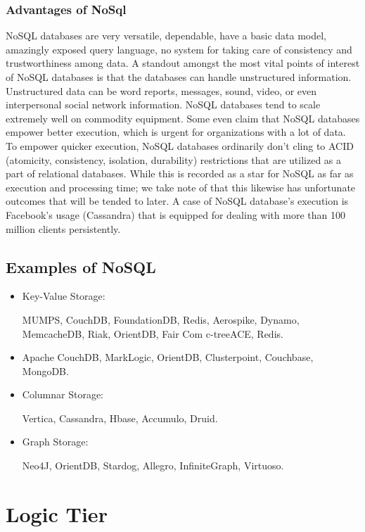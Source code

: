 \subsubsection{Advantages of NoSql}
NoSQL databases are very versatile, dependable, have a basic data model, amazingly exposed query language, no system for taking care of consistency and trustworthiness among data. A standout amongst the most vital points of interest of NoSQL databases is that the databases can handle unstructured information. Unstructured data can be word reports, messages, sound, video, or even interpersonal social network information. NoSQL databases tend to scale extremely well on commodity equipment. Some even claim that NoSQL databases empower better execution, which is urgent for organizations with a lot of data. To empower quicker execution, NoSQL databases ordinarily don't cling to ACID (atomicity, consistency, isolation, durability) restrictions that are utilized as a part of relational databases. While this is recorded as a star for NoSQL as far as execution and processing time; we take note of that this likewise has unfortunate outcomes that will be tended to later. A case of NoSQL database's execution is Facebook's usage (Cassandra) that is equipped for dealing with more than 100 million clients persistently. \cite{AdvantagesnoSql}

\subsection{Examples of NoSQL}
\begin{itemize}
\item Key-Value Storage: \par
MUMPS, CouchDB, FoundationDB, Redis, Aerospike, Dynamo, MemcacheDB, Riak, OrientDB, Fair Com c-treeACE, Redis.

\item Apache CouchDB, MarkLogic, OrientDB, Clusterpoint, Couchbase, MongoDB.

\item Columnar Storage:  \par
Vertica, Cassandra, Hbase, Accumulo, Druid.

\item Graph Storage:  \par
Neo4J, OrientDB, Stardog, Allegro, InfiniteGraph, Virtuoso. 
\end{itemize}

\section{Logic Tier}


